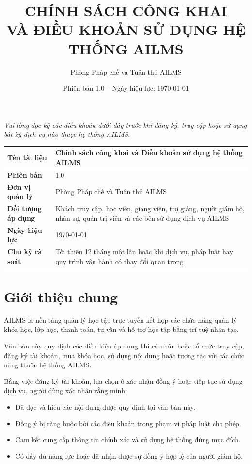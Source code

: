 \documentclass[12pt,a4paper]{article}
\title{
    \textbf{\LARGE CHÍNH SÁCH CÔNG KHAI\\
    VÀ ĐIỀU KHOẢN SỬ DỤNG HỆ THỐNG AILMS}
}
\author{Phòng Pháp chế và Tuân thủ AILMS}
\date{Phiên bản 1.0 -- Ngày hiệu lực: \today}
\begin{document}
\maketitle

\begin{center}
    \textit{Vui lòng đọc kỹ các điều khoản dưới đây trước khi đăng ký,
    truy cập hoặc sử dụng bất kỳ dịch vụ nào thuộc hệ thống AILMS.}
\end{center}

\vspace{0.8cm}

\begin{longtable}{|>{\bfseries}p{4cm}|p{9.5cm}|}
    \hline
    Tên tài liệu &
    Chính sách công khai và Điều khoản sử dụng hệ thống AILMS \\
    \hline
    Phiên bản & 1.0 \\
    \hline
    Đơn vị quản lý & Phòng Pháp chế và Tuân thủ AILMS \\
    \hline
    Đối tượng áp dụng &
    Khách truy cập, học viên, giảng viên, trợ giảng, người giám hộ,
    nhân sự, quản trị viên và các bên sử dụng dịch vụ AILMS \\
    \hline
    Ngày hiệu lực & \today \\
    \hline
    Chu kỳ rà soát &
    Tối thiểu 12 tháng một lần hoặc khi dịch vụ, pháp luật hay
    quy trình vận hành có thay đổi quan trọng \\
    \hline
\end{longtable}

\tableofcontents
\newpage

\section{Giới thiệu chung}

AILMS là nền tảng quản lý học tập trực tuyến kết hợp các chức năng quản lý khóa học,
lớp học, thanh toán, tư vấn và hỗ trợ học tập bằng trí tuệ nhân tạo.

Văn bản này quy định các điều kiện áp dụng khi cá nhân hoặc tổ chức truy cập,
đăng ký tài khoản, mua khóa học, sử dụng nội dung hoặc tương tác với các chức năng
thuộc hệ thống AILMS.

Bằng việc đăng ký tài khoản, lựa chọn ô xác nhận đồng ý hoặc tiếp tục sử dụng dịch vụ,
người dùng xác nhận rằng mình:

\begin{itemize}
    \item Đã đọc và hiểu các nội dung được quy định tại văn bản này.
    \item Đồng ý bị ràng buộc bởi các điều khoản trong phạm vi pháp luật cho phép.
    \item Cam kết cung cấp thông tin chính xác và sử dụng hệ thống đúng mục đích.
    \item Có đầy đủ năng lực hoặc đã nhận được sự đồng ý hợp lệ của người giám hộ.
\end{itemize}
\end{document}

